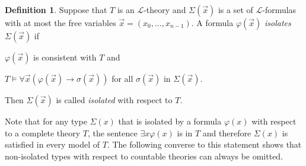 \documentclass[10pt]{amsart}
\renewcommand{\L}{\mathcal{L}}
\theoremstyle{definition}
\newtheorem{definition}[theorem]{Definition}
\theoremstyle{remark}
\newenvironment{enumerate-(a)}{\begin{enumerate}[label={\upshape (\alph*)}, leftmargin=2pc]}{\end{enumerate}}
\begin{document}
\begin{definition} 
Suppose that $T$ is an $\L$-theory and $\Sigma(\vec{x})$ is a set of $\L$-formulas with at most the free variables $\vec{x}=(x_0,\dots,x_{n-1})$. A formula $\varphi(\vec{x})$ \emph{isolates} $\Sigma(\vec{x})$ if 
\begin{enumerate-(a)} 
\item 
$\varphi(\vec{x})$ is consistent with $T$ and 
\item 
$T\models \forall \vec{x} (\varphi(\vec{x})\rightarrow \sigma(\vec{x}))$ for all $\sigma(\vec{x})$ in $\Sigma(\vec{x})$. 
\end{enumerate-(a)} 
Then $\Sigma(\vec{x})$ is called \emph{isolated} with respect to $T$. 
\end{definition} 

Note that for any type $\Sigma(x)$ that is isolated by a formula $\varphi(x)$ with respect to a complete theory $T$, the sentence $\exists x \varphi(x)$ is in $T$ and therefore $\Sigma(x)$ is satisfied in every model of $T$. The following converse to this statement shows that non-isolated types with respect to countable theories can always be omitted. 
\end{document}

